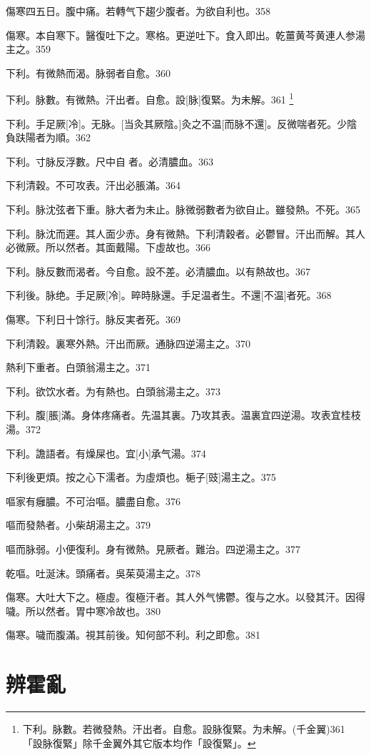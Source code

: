 \documentclass[11pt,oneside,b5paper]{ctexbook}
\begin{document}
\begin{flushleft}
傷寒四五日。腹中痛。若轉气下趨少腹者。为欲自利也。358

傷寒。本自寒下。醫復吐下之。寒格。更逆吐下。食入即出。乾薑黄芩黄連人参湯主之。359

下利。有微熱而渴。脉弱者自愈。360

下利。脉數。有微熱。汗出者。自愈。設[脉]復緊。为未解。361
\footnote{下利。脉數。若微發熱。汗出者。自愈。設脉復緊。为未解。(千金翼)361\\「設脉復緊」除千金翼外其它版本均作「設復緊」。}

下利。手足厥[冷]。无脉。[当灸其厥陰。]灸之不温[而脉不還]。反微喘者死。少陰負趺陽者为順。362

下利。寸脉反浮數。尺中自{𬈧}者。必清膿血。363

下利清穀。不可攻表。汗出必脹滿。364

下利。脉沈弦者下重。脉大者为未止。脉微弱數者为欲自止。雖發熱。不死。365

下利。脉沈而遲。其人面少赤。身有微熱。下利清穀者。必鬱冒。汗出而解。其人必微厥。所以然者。其面戴陽。下虛故也。366

下利。脉反數而渴者。今自愈。設不差。必清膿血。以有熱故也。367

下利後。脉绝。手足厥[冷]。晬時脉還。手足温者生。不還[不温]者死。368

傷寒。下利日十馀行。脉反実者死。369

下利清穀。裏寒外熱。汗出而厥。通脉四逆湯主之。370

熱利下重者。白頭翁湯主之。371

下利。欲饮水者。为有熱也。白頭翁湯主之。373

下利。腹[脹]滿。身体疼痛者。先温其裏。乃攻其表。温裏宜四逆湯。攻表宜桂枝湯。372

下利。譫語者。有燥屎也。宜[小]承气湯。374

下利後更煩。按之心下濡者。为虛煩也。梔子[豉]湯主之。375

嘔家有癰膿。不可治嘔。膿盡自愈。376

嘔而發熱者。小柴胡湯主之。379

嘔而脉弱。小便復利。身有微熱。見厥者。難治。四逆湯主之。377

乾嘔。吐涎沫。頭痛者。吳茱萸湯主之。378

傷寒。大吐大下之。極虛。復極汗者。其人外气怫鬱。復与之水。以發其汗。因得噦。所以然者。胃中寒冷故也。380

傷寒。噦而腹滿。視其前後。知何部不利。利之即愈。381

\chapter{辨霍亂}


\end{flushleft}
\end{document}
